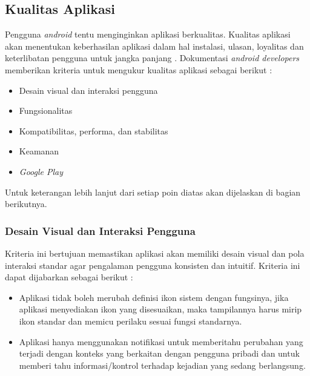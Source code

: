 \subsection{Kualitas Aplikasi}
Pengguna \textit{android} tentu menginginkan aplikasi berkualitas. Kualitas aplikasi akan menentukan keberhasilan aplikasi dalam hal instalasi, ulasan, loyalitas dan keterlibatan pengguna untuk jangka panjang \cite{androiddesign}. Dokumentasi \textit{android developers} memberikan kriteria untuk mengukur kualitas aplikasi sebagai berikut :
\begin{itemize}
    \item Desain visual dan interaksi pengguna
    \item Fungsionalitas
    \item Kompatibilitas, performa, dan stabilitas
    \item Keamanan   
    \item \textit{Google Play}
\end{itemize}
Untuk keterangan lebih lanjut dari setiap poin diatas akan dijelaskan di bagian berikutnya.

\subsubsection{Desain Visual dan Interaksi Pengguna}
Kriteria ini bertujuan memastikan aplikasi akan memiliki desain visual dan pola interaksi standar agar pengalaman pengguna konsisten dan intuitif\cite{androiddev}. Kriteria ini dapat dijabarkan sebagai berikut : 
\begin{itemize}
    \item Aplikasi tidak boleh merubah definisi ikon sistem dengan fungsinya, jika aplikasi menyediakan ikon yang disesuaikan, maka tampilannya harus mirip ikon standar dan memicu perilaku sesuai fungsi standarnya. 
    \item Aplikasi hanya menggunakan notifikasi untuk memberitahu perubahan yang terjadi dengan konteks yang berkaitan dengan pengguna pribadi dan untuk memberi tahu informasi/kontrol terhadap kejadian yang sedang berlangsung.
\end{itemize}

